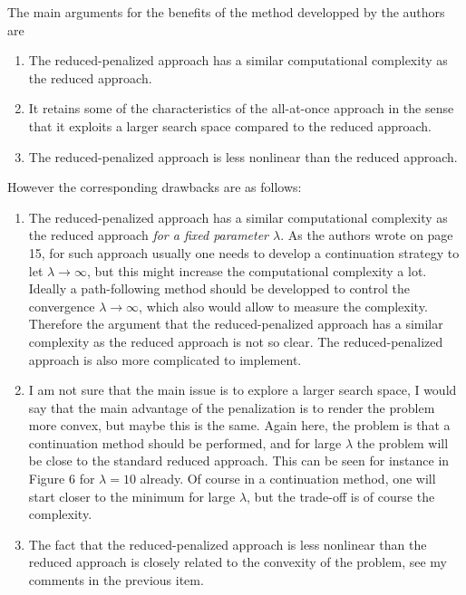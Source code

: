 \documentclass[12pt]{article}
\begin{document}
The main arguments for the benefits of the method developped by the authors are 
\begin{enumerate} 
\item The reduced-penalized approach has a similar computational complexity as the reduced approach. 
\item It retains some of the characteristics of the all-at-once approach in the sense that it exploits a larger search space compared to the reduced approach. 
\item The reduced-penalized approach is less nonlinear than the reduced approach. 
\end{enumerate} 
% 
However the corresponding drawbacks are as follows: 
\begin{enumerate} 
\item The reduced-penalized approach has a similar computational complexity as the reduced approach {\it for a fixed parameter $\lambda$}. As the authors wrote on page 15, for such approach usually one needs to develop a continuation strategy to let $\lambda\to\infty$, but this might increase the computational complexity a lot. Ideally a path-following method should be developped to control the convergence $\lambda\to\infty$, which also would allow to measure the complexity. Therefore the argument that the reduced-penalized approach has a similar complexity as the reduced approach is not so clear. The reduced-penalized approach is also more complicated to implement. 
\item I am not sure that the main issue is to explore a larger search space, I would say that the main advantage of the penalization is to render the problem more convex, but maybe this is the same. Again here, the problem is that a continuation method should be performed, and for large $\lambda$ the problem will be close to the standard reduced approach. This can be seen for instance in Figure 6 for $\lambda=10$ already. Of course in a continuation method, one will start closer to the minimum for large $\lambda$, but the trade-off is of course the complexity. 
\item The fact that the reduced-penalized approach is less nonlinear than the reduced approach is closely related to the convexity of the problem, see my comments in the previous item. 
\end{enumerate} 
\end{document}
